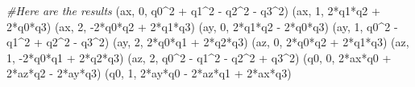 \documentclass[]{article}
\newenvironment{Shaded}{}{}
\newcommand{\DecValTok}[1]{\textcolor[rgb]{0.25,0.63,0.44}{#1}}
\newcommand{\CommentTok}[1]{\textcolor[rgb]{0.38,0.63,0.69}{\textit{#1}}}
\newcommand{\OperatorTok}[1]{\textcolor[rgb]{0.40,0.40,0.40}{#1}}
\newcommand{\NormalTok}[1]{#1}
\begin{document}
\begin{Shaded}
\begin{Highlighting}[]
\CommentTok{#Here are the results}
\NormalTok{(ax, }\DecValTok{0}\NormalTok{, q0}\OperatorTok{^}\DecValTok{2} \OperatorTok{+}\NormalTok{ q1}\OperatorTok{^}\DecValTok{2} \OperatorTok{-}\NormalTok{ q2}\OperatorTok{^}\DecValTok{2} \OperatorTok{-}\NormalTok{ q3}\OperatorTok{^}\DecValTok{2}\NormalTok{)}
\NormalTok{(ax, }\DecValTok{1}\NormalTok{, }\DecValTok{2}\OperatorTok{*}\NormalTok{q1}\OperatorTok{*}\NormalTok{q2 }\OperatorTok{+} \DecValTok{2}\OperatorTok{*}\NormalTok{q0}\OperatorTok{*}\NormalTok{q3)}
\NormalTok{(ax, }\DecValTok{2}\NormalTok{, }\OperatorTok{-}\DecValTok{2}\OperatorTok{*}\NormalTok{q0}\OperatorTok{*}\NormalTok{q2 }\OperatorTok{+} \DecValTok{2}\OperatorTok{*}\NormalTok{q1}\OperatorTok{*}\NormalTok{q3)}
\NormalTok{(ay, }\DecValTok{0}\NormalTok{, }\DecValTok{2}\OperatorTok{*}\NormalTok{q1}\OperatorTok{*}\NormalTok{q2 }\OperatorTok{-} \DecValTok{2}\OperatorTok{*}\NormalTok{q0}\OperatorTok{*}\NormalTok{q3)}
\NormalTok{(ay, }\DecValTok{1}\NormalTok{, q0}\OperatorTok{^}\DecValTok{2} \OperatorTok{-}\NormalTok{ q1}\OperatorTok{^}\DecValTok{2} \OperatorTok{+}\NormalTok{ q2}\OperatorTok{^}\DecValTok{2} \OperatorTok{-}\NormalTok{ q3}\OperatorTok{^}\DecValTok{2}\NormalTok{)}
\NormalTok{(ay, }\DecValTok{2}\NormalTok{, }\DecValTok{2}\OperatorTok{*}\NormalTok{q0}\OperatorTok{*}\NormalTok{q1 }\OperatorTok{+} \DecValTok{2}\OperatorTok{*}\NormalTok{q2}\OperatorTok{*}\NormalTok{q3)}
\NormalTok{(az, }\DecValTok{0}\NormalTok{, }\DecValTok{2}\OperatorTok{*}\NormalTok{q0}\OperatorTok{*}\NormalTok{q2 }\OperatorTok{+} \DecValTok{2}\OperatorTok{*}\NormalTok{q1}\OperatorTok{*}\NormalTok{q3)}
\NormalTok{(az, }\DecValTok{1}\NormalTok{, }\OperatorTok{-}\DecValTok{2}\OperatorTok{*}\NormalTok{q0}\OperatorTok{*}\NormalTok{q1 }\OperatorTok{+} \DecValTok{2}\OperatorTok{*}\NormalTok{q2}\OperatorTok{*}\NormalTok{q3)}
\NormalTok{(az, }\DecValTok{2}\NormalTok{, q0}\OperatorTok{^}\DecValTok{2} \OperatorTok{-}\NormalTok{ q1}\OperatorTok{^}\DecValTok{2} \OperatorTok{-}\NormalTok{ q2}\OperatorTok{^}\DecValTok{2} \OperatorTok{+}\NormalTok{ q3}\OperatorTok{^}\DecValTok{2}\NormalTok{)}
\NormalTok{(q0, }\DecValTok{0}\NormalTok{, }\DecValTok{2}\OperatorTok{*}\NormalTok{ax}\OperatorTok{*}\NormalTok{q0 }\OperatorTok{+} \DecValTok{2}\OperatorTok{*}\NormalTok{az}\OperatorTok{*}\NormalTok{q2 }\OperatorTok{-} \DecValTok{2}\OperatorTok{*}\NormalTok{ay}\OperatorTok{*}\NormalTok{q3)}
\NormalTok{(q0, }\DecValTok{1}\NormalTok{, }\DecValTok{2}\OperatorTok{*}\NormalTok{ay}\OperatorTok{*}\NormalTok{q0 }\OperatorTok{-} \DecValTok{2}\OperatorTok{*}\NormalTok{az}\OperatorTok{*}\NormalTok{q1 }\OperatorTok{+} \DecValTok{2}\OperatorTok{*}\NormalTok{ax}\OperatorTok{*}\NormalTok{q3)}

\end{Highlighting}
\end{Shaded}
\end{document}
